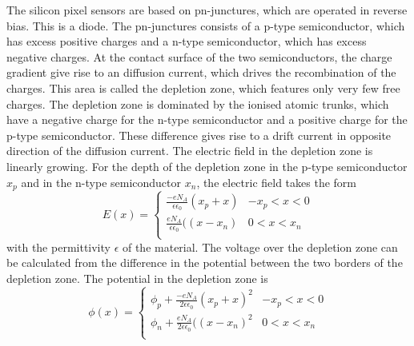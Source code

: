 \documentclass[twocolumn,DIV=14,a4paper,biblatex, 10pt]{scrartcl}
\newcommand{\atlaspix}{\texttt{ATLASpix1}\xspace}
\begin{document}



The silicon pixel sensors are based on pn-junctures, which are operated in reverse bias. This is a diode. The pn-junctures consists of a p-type semiconductor, which has excess positive charges and a n-type semiconductor, which has excess negative charges. At the contact surface of the two semiconductors, the  charge gradient give rise to an diffusion current, which drives the recombination of the charges. This area is called the depletion zone, which features only very few free charges. The depletion zone is dominated by the ionised atomic trunks, which have a negative charge for the n-type semiconductor and a positive charge for the p-type semiconductor. These difference gives rise to a drift current in opposite direction of the diffusion current. The electric field in the depletion zone is linearly growing. For the depth of the depletion zone in the p-type semiconductor $x_p$ and in the n-type semiconductor $x_n$, the electric field takes the form
$$E (x) = \left\{
\begin{array}{ll}
\frac{-e N_A}{\epsilon \epsilon_0}(x_p+x) & -x_p<x<0 \\
\frac{e N_A}{\epsilon \epsilon_0}((x-x_n) & 0<x<x_n \\
\end{array}
\right. $$
with the permittivity $\epsilon$ of the material. The voltage over the depletion zone can be calculated from the difference in the potential between the two borders of the depletion zone. The potential in the depletion zone is
$$\phi (x) = \left\{
\begin{array}{ll}
\phi_p+\frac{-e N_A}{2\epsilon \epsilon_0}(x_p+x)^2 & -x_p<x<0 \\
\phi_n+\frac{e N_A}{2\epsilon \epsilon_0}((x-x_n)^2 & 0<x<x_n \\
\end{array}
\right. $$
\end{document}
